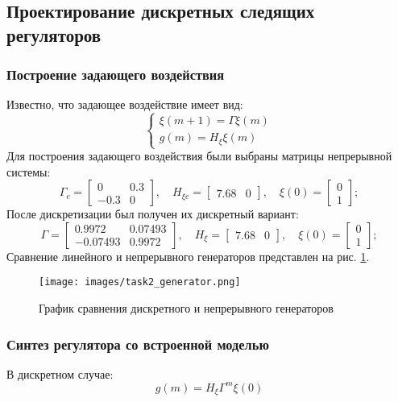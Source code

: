 \documentclass[a4paper, 14pt]{extarticle}
\theoremstyle{definition}
\theoremstyle{plain}
\theoremstyle{remark}
\begin{document}
\subsection{Проектирование дискретных следящих регуляторов}
\subsubsection{Построение задающего воздействия}
Известно, что задающее воздействие имеет вид:
\[
\begin{cases}
	\xi(m+1) = \Gamma \xi(m)\\
	g(m) = H_\xi \xi(m)
\end{cases}
\]
Для построения задающего воздействия были выбраны матрицы непрерывной системы:
\[
	\Gamma_c = \begin{bmatrix} 0 & 0.3 \\ -0.3 & 0 \end{bmatrix}, \quad
	H_{\xi c} = \begin{bmatrix} 7.68 & 0 \end{bmatrix}, \quad
	\xi(0) = \begin{bmatrix} 0 \\ 1 \end{bmatrix};
\]
После дискретизации был получен их дискретный вариант:
\[
    \Gamma = \begin{bmatrix} 0.9972 & 0.07493 \\ -0.07493 & 0.9972 \end{bmatrix}, \quad
    H_\xi = \begin{bmatrix} 7.68 & 0 \end{bmatrix}, \quad
	\xi(0) = \begin{bmatrix} 0 \\ 1 \end{bmatrix};
\]
Сравнение линейного и непрерывного генераторов представлен на рис. \ref{fig:task2_gen}.
\begin{figure}
	[H]
	\centering
	\texttt{[image: images/task2\_generator.png]}
	\caption{График сравнения дискретного и непрерывного генераторов}
	\label{fig:task2_gen}
\end{figure}
\subsubsection{Синтез регулятора со встроенной моделью}
В дискретном случае:
\[g(m) = H_\xi \Gamma^m \xi(0)\]
\end{document}
